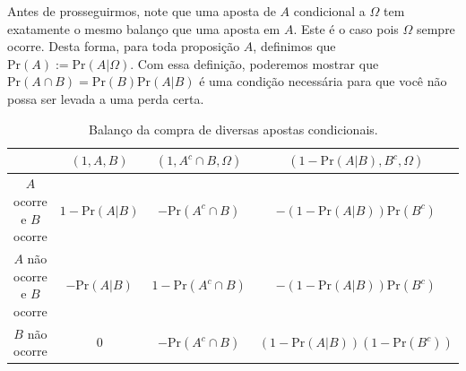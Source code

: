 Antes de prosseguirmos, note que 
uma aposta de $A$ condicional a $\Omega$
tem exatamente o mesmo balanço que uma aposta em $A$.
Este é o caso pois $\Omega$ sempre ocorre.
Desta forma, para toda proposição $A$, definimos que 
$\text{Pr}(A) := \text{Pr}(A|\Omega)$.
Com essa definição, poderemos mostrar que 
$\text{Pr}(A \cap B) = \text{Pr}(B)\text{Pr}(A|B)$ é 
uma condição necessária para que 
você não possa ser levada a uma perda certa.

\begin{table}
 \centering
 \begin{tabular}{|c|c|c|c|}
  \hline
  & $(1,A,B)$
  & $(1, A^{c} \cap B, \Omega)$
  &	$(1-\text{Pr}(A|B),B^{c},\Omega)$ \\
  \hline
  $A$ ocorre e $B$ ocorre
  & $1-\text{Pr}(A|B)$
  &	$-\text{Pr}(A^{c} \cap B)$
  & $-(1-\text{Pr}(A|B))\text{Pr}(B^{c})$ \\
  $A$ não ocorre e $B$ ocorre
  & $-\text{Pr}(A|B)$
  & $1-\text{Pr}(A^{c} \cap B)$
  & $-(1-\text{Pr}(A|B))\text{Pr}(B^{c})$ \\
  $B$ não ocorre
  &	$0$
  & $-\text{Pr}(A^{c} \cap B)$
  & $(1-\text{Pr}(A|B))(1-\text{Pr}(B^{c}))$ \\
  \hline
 \end{tabular}
 \caption{Balanço da compra de 
 diversas apostas condicionais.} 
 \label{table:portfolio_a|b}
\end{table}

